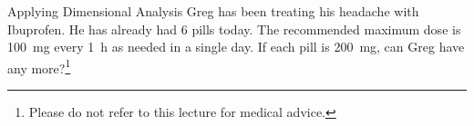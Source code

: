 \documentclass[notes=show]{beamer}
\begin{document}
\begin{frame}[t]{Applying Dimensional Analysis}
	Greg has been treating his headache with Ibuprofen. He has already had 6
	pills today. The recommended maximum dose is \SI{100}{\milli\gram} every
	\SI{1}{h} as needed in a single day. If each pill is
	\SI{200}{\milli\gram}, can Greg have any more?\footnote{Please do not
	refer to this lecture for medical advice.}

\end{frame}
\end{document}

